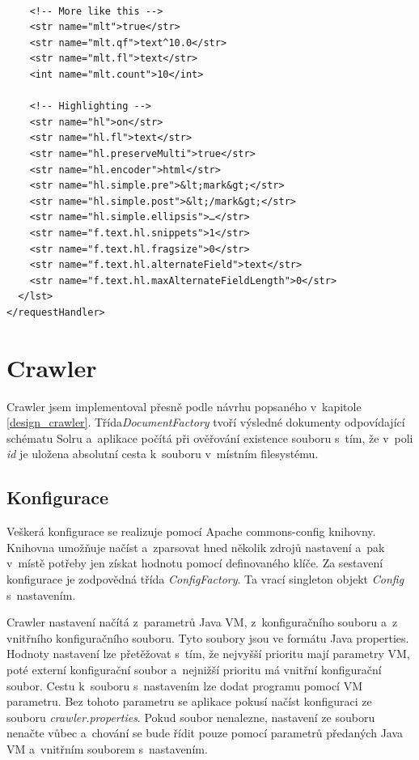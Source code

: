 \begin{verbatim}
    
    <!-- More like this -->
    <str name="mlt">true</str>
    <str name="mlt.qf">text^10.0</str>
    <str name="mlt.fl">text</str>
    <int name="mlt.count">10</int>
    
    <!-- Highlighting -->
    <str name="hl">on</str>
    <str name="hl.fl">text</str>
    <str name="hl.preserveMulti">true</str>
    <str name="hl.encoder">html</str>
    <str name="hl.simple.pre">&lt;mark&gt;</str>
    <str name="hl.simple.post">&lt;/mark&gt;</str>
    <str name="hl.simple.ellipsis">…</str>
    <str name="f.text.hl.snippets">1</str>
    <str name="f.text.hl.fragsize">0</str>
    <str name="f.text.hl.alternateField">text</str>
    <str name="f.text.hl.maxAlternateFieldLength">0</str>
  </lst>
</requestHandler>
\end{verbatim}

\section{Crawler}
Crawler jsem implementoval přesně podle návrhu popsaného v~kapitole \ref{design_crawler}. Třída\emph{DocumentFactory} tvoří výsledné dokumenty odpovídající schématu Solru a~aplikace počítá při ověřování existence souboru s~tím, že v~poli \emph{id} je uložena absolutní cesta k~souboru v~místním filesystému.

\subsection{Konfigurace}
Veškerá konfigurace se realizuje pomocí Apache commons-config knihovny. Knihovna umožňuje načíst a~zparsovat hned několik zdrojů nastavení a~pak v~místě potřeby jen získat hodnotu pomocí definovaného klíče. Za sestavení konfigurace je zodpovědná třída \emph{ConfigFactory}. Ta vrací singleton objekt \emph{Config} s~nastavením.

Crawler nastavení načítá z~parametrů Java VM, z~konfiguračního souboru a~z vnitřního konfiguračního souboru. Tyto soubory jsou ve formátu Java properties. Hodnoty nastavení lze přetěžovat s~tím, že nejvyšší prioritu mají parametry VM, poté externí konfigurační soubor a~nejnižší prioritu má vnitřní konfigurační soubor. Cestu k~souboru s~nastavením lze dodat programu pomocí VM parametru. Bez tohoto parametru se aplikace pokusí načíst konfiguraci ze souboru \emph{crawler.properties}. Pokud soubor nenalezne, nastavení ze souboru nenačte vůbec a~chování se bude řídit pouze pomocí parametrů předaných Java VM a~vnitřním souborem s~nastavením.

